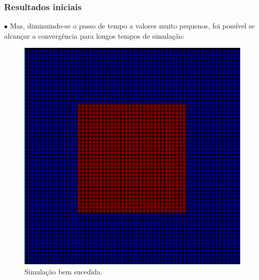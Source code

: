 \documentclass[xcolor=dvipsnames,10pt,aspectratio=169]{beamer}
\begin{document}
	\begin{frame}
	\frametitle{Resultados iniciais}
	
	$\bullet$ Mas, diminuindo-se o passo de tempo a valores muito pequenos, foi possível se alcançar a convergência para longos tempos de simulação:
	
	
	\begin{minipage}[h!]{0.30\textwidth}
		\begin{figure}[h!]
			\centering
			\includegraphics[trim = {1cm 1cm 1cm 1cm}, clip , angle=0, scale=0.3]{sucesso_!}
			\caption{Simulação bem sucedida.}
		\end{figure}
	\end{minipage}
	\begin{minipage}[h!]{0.30\textwidth}
		\begin{figure}[h!]
			\centering

\end{figure}
\end{minipage}
\end{frame}
\end{document}
